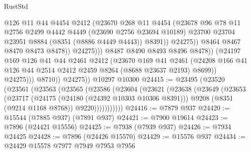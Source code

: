 \begin{lexlean}{RustStd}
\begin{coremodule}
                                  @126
                                  @11
                                  @44
                                  @4454
                                  @2412
                                  (@23670
                                    @268
                                    @11
                                    @4454
                                    (@23678
                                      @96
                                      @78
                                      @11
                                      @2756
                                      @2499
                                      @4442
                                      @4449
                                      (@23690 @2756 @23694 @10189)
                                      @23700
                                      @23704
                                      @23951
                                      @8884
                                      (@8351 (@8886 @4449 @4443))
                                      @8391))
                                  @24275))
                              @8464
                              @8467
                              @8470
                              @8473
                              @8478))
                          @24275)))
                    @8487
                    @8490
                    @8493
                    @8496
                    @8478))
                (@24197
                  @169
                  @126
                  @41
                  @44
                  @2461
                  @2412
                  (@23670
                    @169
                    @41
                    @2461
                    (@24208 @166 @41 @126 @44 @2514 @2412 @2459 @8264 (@8688 @23637 @2193) @8699))
                  @24275)))
            @8710))
        @24275))
    @10297
    @10300
@24415 := @23495
    (@23520
      (@23561
        (@23563
          (@23565
            (@23586
              (@23604
                (@23621
                  (@23638
                    (@23649
                      (@23653
                        (@23717
                          (@24175 (@24180 (@24392 @10303 @10306 @8391)))
                          @9208
                          (@8351 (@9214 @1168 @8768))
                          @9220)))))))))))
@24416 := @7879 @937
@24420 := @15544 (@7885 @937) (@7891 @937)
@24421 := @7900 @19614
@24423 := @7896 (@24421 @15556)
@24425 := @7938 (@7939 @937)
@24426 := @7934 @24425
@24428 := @7896 (@24426 @15570)
@24429 := @15576 @937
@24434 := @24429 @15578 @7977 @7949 @7953 @7956

\end{coremodule}
\end{lexlean}
